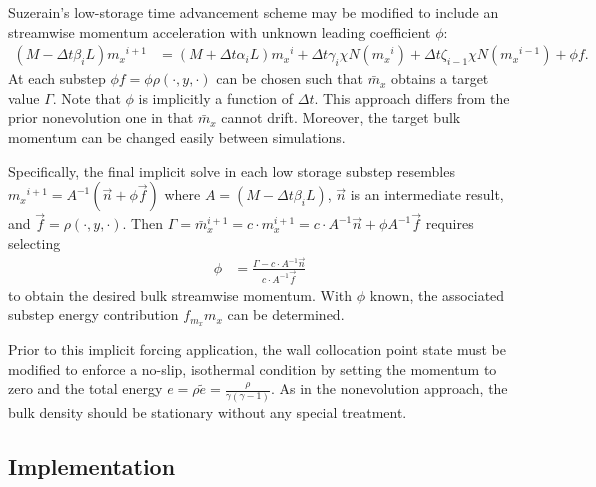 \documentclass[letterpaper,11pt,nointlimits,reqno]{amsart}
\begin{document}
Suzerain's low-storage time advancement scheme may be modified to include an
streamwise momentum acceleration with unknown leading coefficient $\phi$:
\begin{align}
  \left(M - \Delta{}t\beta_{i}L\right) {m_x}^{i+1}
  &=
  \left(M + \Delta{}t\alpha_{i}L\right) {m_x}^{i}
  + \Delta{}t\gamma_{i}\chi{}N\left({m_x}^{i}\right)
  + \Delta{}t\zeta_{i-1}\chi{}N\left({m_x}^{i-1}\right)
  + \phi{} f
  .
\end{align}
At each substep $\phi{} f = \phi\rho\!\left(\cdot,y,\cdot\right)$ can be chosen
such that $\bar{m}_x$ obtains a target value $\Gamma$.  Note that $\phi$ is
implicitly a function of $\Delta{}t$.  This approach differs from the prior
nonevolution one in that $\bar{m}_x$ cannot drift.  Moreover, the target bulk
momentum can be changed easily between simulations.

Specifically, the final implicit solve in each low storage substep resembles
${m_x}^{i+1} = A^{-1}\left(\vec{n} + \phi\vec{f}\right)$ where $A = \left(M -
\Delta{}t\beta_{i}L\right)$, $\vec{n}$ is an intermediate result, and $\vec{f}
= \rho\!\left(\cdot,y,\cdot\right)$.  Then $\Gamma = \bar{m}_x^{i+1} = c \cdot
m_x^{i+1} = c \cdot{} A^{-1}\vec{n} + \phi{}A^{-1}\vec{f}$ requires selecting
\begin{align}
  \phi &= \frac{\Gamma - c \cdot{} A^{-1} \vec{n}}{c \cdot{} A^{-1} \vec{f}}
  \label{eq:phitarget}
\end{align}
to obtain the desired bulk streamwise momentum.  With $\phi$ known, the
associated substep energy contribution $f_{m_x} m_{x}$ can be determined.

Prior to this implicit forcing application, the wall collocation point state
must be modified to enforce a no-slip, isothermal condition by setting the
momentum to zero and the total energy $e = \rho \tilde{e} =
\frac{\rho}{\gamma\left(\gamma-1\right)}$.  As in the nonevolution approach,
the bulk density should be stationary without any special treatment.

\subsection{Implementation}
\end{document}
